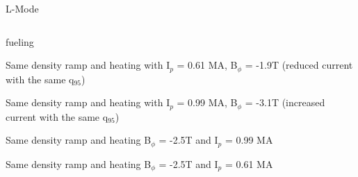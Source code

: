 \documentclass[10pt, compress]{beamer}
\begin{document}
\begin{frame}{L-Mode}
\begin{columns}
\begin{column}{0.5\textwidth}
\begin{description}
        fueling
      \item[\# 2] Same density ramp and heating with I$_p$ = 0.61 MA,
        B$_{\phi}$ = -1.9T (reduced current with the same q$_{95}$)
      \item[\# 3] Same density ramp and heating with I$_p$ = 0.99 MA,
        B$_{\phi}$ = -3.1T (increased current with the same q$_{95}$)
      \item[\# 4] Same density ramp and heating B$_{\phi}$ = -2.5T and I$_{p}$ = 0.99 MA
      \item[\# 5] Same density ramp and heating B$_{\phi}$ = -2.5T and I$_{p}$ = 0.61 MA
    \end{description}
  
  \end{column}
\end{columns}
\end{frame}
\end{document}
